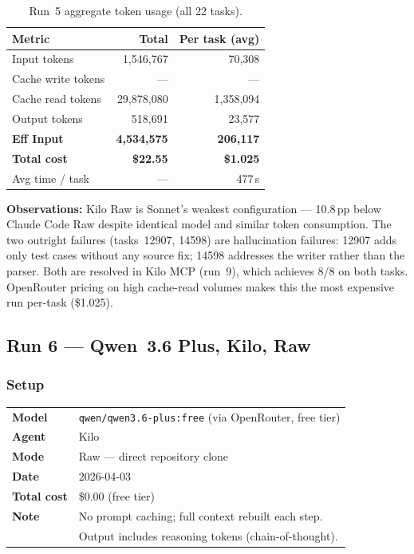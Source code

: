 \begin{table}[h]
\centering
\caption{Run~5 aggregate token usage (all 22 tasks).}\label{tab:r5-tokens}
\begin{tabular}{lrr}
\toprule
\textbf{Metric} & \textbf{Total} & \textbf{Per task (avg)} \\
\midrule
Input tokens         & 1,546,767  & 70,308 \\
Cache write tokens   & ---        & --- \\
Cache read tokens    & 29,878,080 & 1,358,094 \\
Output tokens        & 518,691    & 23,577 \\
\midrule
\textbf{Eff Input}   & \textbf{4,534,575} & \textbf{206,117} \\
\textbf{Total cost}  & \textbf{\$22.55}   & \textbf{\$1.025} \\
Avg time / task      & ---         & 477\,s \\
\bottomrule
\end{tabular}
\end{table}

\noindent
\textbf{Observations:} Kilo Raw is Sonnet's weakest configuration --- 10.8\,pp
below Claude Code Raw despite identical model and similar token consumption.
The two outright failures (tasks~12907, 14598) are hallucination failures:
12907 adds only test cases without any source fix; 14598 addresses the
writer rather than the parser.
Both are resolved in Kilo MCP (run~9), which achieves 8/8 on both tasks.
OpenRouter pricing on high cache-read volumes makes this the most expensive
run per-task (\$1.025).

\subsection{Run 6 --- Qwen~3.6 Plus, Kilo, Raw}
\label{sec:run6}

\subsubsection{Setup}

\begin{tabular}{ll}
\textbf{Model}     & \texttt{qwen/qwen3.6-plus:free} (via OpenRouter, free tier) \\
\textbf{Agent}     & Kilo \\
\textbf{Mode}      & Raw --- direct repository clone \\
\textbf{Date}      & 2026-04-03 \\
\textbf{Total cost} & \$0.00 (free tier) \\
\textbf{Note}      & No prompt caching; full context rebuilt each step. \\
                   & Output includes reasoning tokens (chain-of-thought). \\
\end{tabular}

